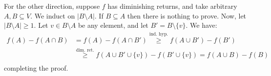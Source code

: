 \documentclass[12pt]{article}
\begin{document}
\begin{enumerate}
For the other direction, suppose $f$ has diminishing returns, and take arbitrary $A,B \subseteq V$. We induct on $|B \setminus A|$. If $B \subseteq A$ then there is nothing to prove. %
Now, let $|B \setminus A| \ge 1$. Let $v \in B \setminus A$ be any element, and let $B' = B \setminus \{v\}$. We have:
\begin{align*}
  f(A) - f(A\cap B) &= f(A) - f(A\cap B') \overset{\text{ind. hyp.}}\ge f(A\cup B') - f(B') \\
   & \overset{\text{dim. ret.}}\ge f(A\cup B' \cup \{v\}) - f(B' \cup \{v\}) = f(A \cup B) - f(B) \\
\end{align*}
completing the proof.
\end{enumerate}
\end{document}
